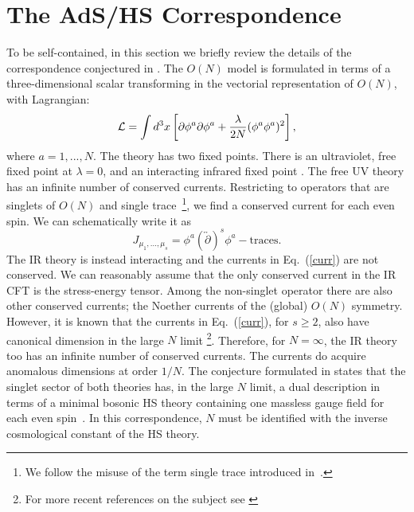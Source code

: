 \documentclass[a4paper,12pt]{article}
\begin{document}
\section{The AdS/HS Correspondence}
To be self-contained, 
in this section we  briefly review the details of the correspondence 
conjectured in \cite{kp}. 
The $O(N)$ model is formulated in terms of a three-dimensional
scalar transforming in the vectorial representation of $O(N)$, with
Lagrangian:
\begin{equation}
  {\cal L}=\int d^3x \left [\partial \phi^a \partial \phi^a +
{\lambda\over 2N}(\phi^a\phi^a)^2\right],
\label{lag}
\end{equation}
where $a=1,...,N$. The theory has two fixed points. There is an
ultraviolet, free fixed point at $\lambda=0$, and an interacting
infrared fixed point \cite{wilson}. The free UV theory has an infinite
number of conserved currents.  Restricting to operators that are
singlets of $O(N)$ and single trace~\footnote{We follow the misuse of
the term single trace introduced in~\cite{kp}.}, we find a conserved
current for each even spin. We can schematically write it as
\begin{equation}
J_{\mu_1,...,\mu_s}=\phi^a (\overleftrightarrow{\partial})^s\phi^a- 
\mbox{traces}.
\label{curr}
\end{equation}
The IR theory is instead interacting and the currents in
Eq.~(\ref{curr}) are not conserved. We can reasonably assume that the
only conserved current in the IR CFT is the stress-energy
tensor. Among the non-singlet operator there are also other conserved
currents; the Noether currents of the (global) $O(N)$ symmetry.
However, it is known \cite{wilson} that the currents in
Eq.~(\ref{curr}), for $s\ge 2$, also have canonical dimension in the
large $N$ limit
\footnote{For more recent references on the subject see \cite{on}}.
Therefore, for $N=\infty$, the IR theory too has an infinite number of
conserved currents. The currents do acquire anomalous dimensions at
order $1/N$. The conjecture formulated in \cite{kp} states that the
singlet sector of both theories has, in the large $N$ limit, a dual
description in terms of a minimal bosonic HS theory containing one
massless gauge field for each even spin~\cite{v}. In this
correspondence, $N$ must be identified with the inverse cosmological
constant of the HS theory.
\end{document}
